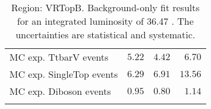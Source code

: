 \begin{table}
\begin{center}
{\begin{tabular*}{\textwidth}{@{\extracolsep{\fill}}lrrr}
        MC exp. TtbarV events         & $5.22$          & $4.42$          & $6.70$              \\
        MC exp. SingleTop events         & $6.29$          & $6.91$          & $13.56$              \\
        MC exp. Diboson events         & $0.95$          & $0.80$          & $1.14$              \\
\noalign{\smallskip}\hline\noalign{\smallskip}
\end{tabular*}
}
\end{center}
\caption{Region: VRTopB. Background-only fit results for an integrated luminosity of 36.47 \ifb. The uncertainties are statistical and systematic.
}
\label{table.bkgonly.VRTopB}
\end{table}
%